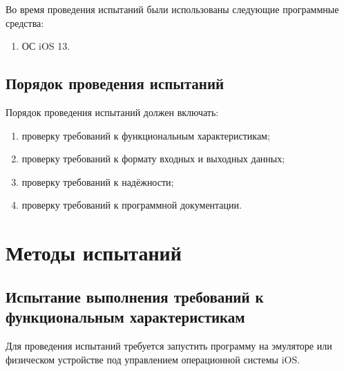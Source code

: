 \documentclass{../includes/TechDoc}
\begin{document}
    Во время проведения испытаний были использованы следующие программные средства:
    \begin{enumerate}
        \item ОС iOS 13.
    \end{enumerate}

    \subsection{Порядок проведения испытаний}

    Порядок проведения испытаний должен включать:
    \begin{enumerate}
        \item проверку требований к функциональным характеристикам;
        \item проверку требований к формату входных и выходных данных;
        \item проверку требований к надёжности;
        \item проверку требований к программной документации.
    \end{enumerate}


    \section{Методы испытаний}

    \subsection{Испытание выполнения требований к функциональным характеристикам}

    Для проведения испытаний требуется запустить программу на эмуляторе или физическом устройстве под управлением операционной системы iOS\@.
\end{document}
